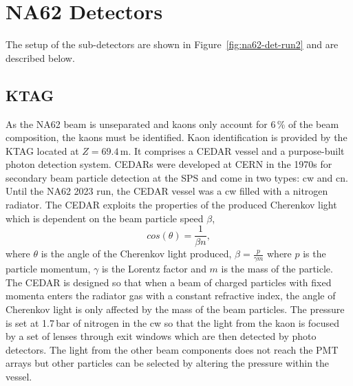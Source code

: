 \documentclass[../../main.tex]{subfiles}
\begin{document}
    \section{NA62 Detectors}\label{sec:sub-det}
    The setup of the sub-detectors are shown in Figure~\ref{fig:na62-det-run2} and are described below.
    
    \subsection{KTAG}\label{sec:KTAG}
    As the NA62 beam is unseparated and kaons only account for 6\,\% of the beam composition, the kaons must be identified. Kaon identification is provided by the KTAG located at $Z=69.4$\,m. It comprises a \gls{CEDAR} vessel and a purpose-built
    photon detection system. \glspl{CEDAR} were developed at CERN in the 1970s \cite{Bovet:1982xf} for secondary beam particle detection at the \gls{SPS} and come in two types: \gls{cw} and \gls{cn}. Until the NA62 2023 run, the \gls{CEDAR} vessel was a \gls{cw} filled with a nitrogen radiator.
    The \gls{CEDAR} exploits the properties of the produced Cherenkov light which is dependent on the beam particle speed $\beta$, 
    \begin{equation}\label{eq:Cherenkov}
        cos(\theta) = \frac{1}{\beta n},
    \end{equation}
    where $\theta$ is the angle of the Cherenkov light produced, $\beta = \frac{p}{\gamma m}$ where $p$ is the particle momentum, $\gamma$ is the Lorentz factor and $m$ is the mass of the particle.
    The \gls{CEDAR} is designed so that when a beam of charged particles with fixed momenta enters the radiator gas with a constant refractive index, the angle of Cherenkov light is only affected by the mass of the beam particles.
    The pressure is set at 1.7\,bar of nitrogen in the \gls{cw} so that the light from the 
    kaon is focused by a set of lenses through exit windows which are then detected by photo detectors. The light from the other beam components does not reach the PMT arrays but other particles can be selected by altering the pressure within the vessel. %
\end{document}
